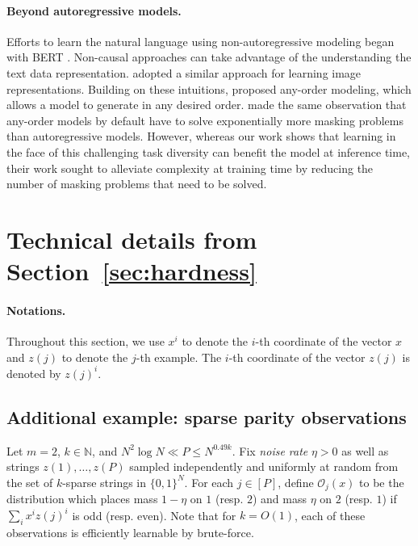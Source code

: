 \paragraph{Beyond autoregressive models.}
Efforts to learn the natural language using non-autoregressive modeling began with BERT \cite{devlin-etal-2019-bert}. Non-causal approaches can take advantage of the understanding the text data representation. \cite{chang2022maskgit} adopted a similar approach for learning image representations. Building on these intuitions, 
\cite{shih2022training,hoogeboom2022autoregressive} proposed any-order modeling, which allows a model to generate in any desired order. \citet{shih2022training} made the same observation that any-order models by default have to solve exponentially more masking problems than autoregressive models. However, whereas our work shows that learning in the face of this challenging task diversity can benefit the model at inference time, their work sought to alleviate complexity at training time by reducing the number of masking problems that need to be solved.


\section{Technical details from Section~\ref{sec:hardness}}


\paragraph{Notations.} Throughout this section, we use $x^i$ to denote the $i$-th coordinate of the vector $x$ and $z{(j)}$ to denote the $j$-th example. The $i$-th coordinate of the vector $z{(j)}$ is denoted by $z{(j)}^i$.

\subsection{Additional example: sparse parity observations}
\label{app:parity}

\begin{example}\label{example:xor}
    Let $m = 2$,  $k\in\mathbb{N}$, and $N^2\log N \ll P \le N^{0.49k}$. Fix \emph{noise rate} $\eta > 0$ as well as strings $z{(1)},\ldots, z{(P)}$ sampled independently and uniformly at random from the set of $k$-sparse strings in $\{0,1\}^N$. For each $j\in[P]$, define $\mathcal{O}_j(x)$ to be the distribution which places mass $1 -\eta$ on $1$ (resp. $2$) and mass $\eta$ on $2$ (resp. $1$) if $\sum_i x^i z{(j)}^i$ is odd (resp. even). Note that for $k = O(1)$, each of these observations is efficiently learnable by brute-force.
\end{example}

